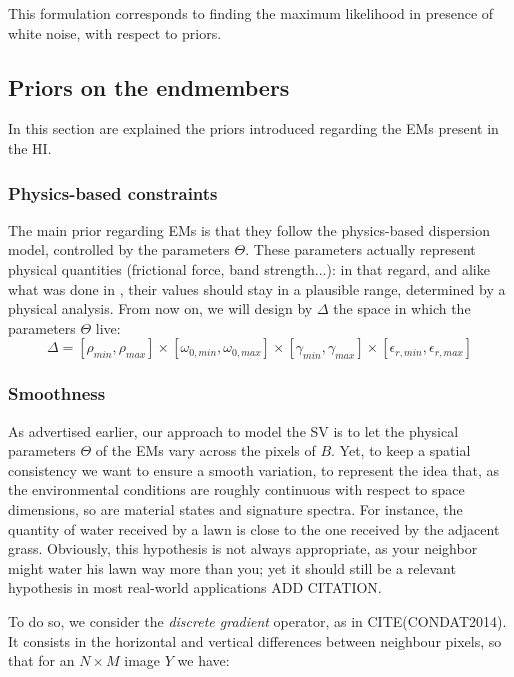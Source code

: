 \documentclass{article}
\begin{document}
This formulation corresponds to finding the maximum likelihood in presence of white noise, with respect to priors.

\subsection{Priors on the endmembers}
In this section are explained the priors introduced regarding the EMs present in the HI.

\subsubsection{Physics-based constraints}

The main prior regarding EMs is that they follow the physics-based dispersion model, controlled by the parameters $\Theta$. These parameters actually represent physical quantities (frictional force, band strength...): in that regard, and alike what was done in \cite{janiczek_differentiable_2020}, their values should stay in a plausible range, determined by a physical analysis. From now on, we will design by $\Delta$ the space in which the parameters $\Theta$ live:
$$\Delta = [\rho_{min}, \rho_{max}] \times [\omega_{0, min}, \omega_{0, max}] \times [\gamma_{min}, \gamma_{max}] \times [\epsilon_{r, min}, \epsilon_{r, max}]$$

\subsubsection{Smoothness}\label{sec:EM-smoothness}

As advertised earlier, our approach to model the SV is to let the physical parameters $\Theta$ of the EMs vary across the pixels of $B$. Yet, to keep a spatial consistency we want to ensure a smooth variation, to represent the idea that, as the environmental conditions are roughly continuous with respect to space dimensions, so are material states and signature spectra. For instance, the quantity of water received by a lawn is close to the one received by the adjacent grass. Obviously, this hypothesis is not always appropriate, as your neighbor might water his lawn way more than you; yet it should still be a relevant hypothesis in most real-world applications ADD CITATION.

To do so, we consider the \emph{discrete gradient} operator, as in CITE(CONDAT2014). It consists in the horizontal and vertical differences between neighbour pixels, so that for an $N \times M$ image $Y$ we have:
\end{document}
